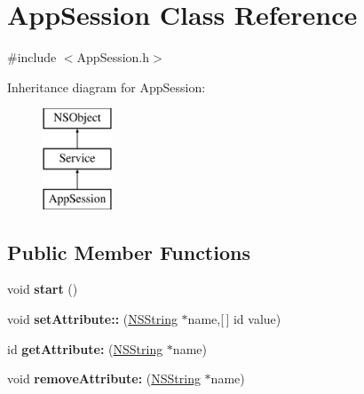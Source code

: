 \hypertarget{interface_app_session}{
\section{\-App\-Session \-Class \-Reference}
\label{interface_app_session}
}


{\ttfamily \#include $<$\-App\-Session.\-h$>$}

\-Inheritance diagram for \-App\-Session\-:\begin{figure}[H]
\begin{center}
\leavevmode
\includegraphics[height=3.000000cm]{interface_app_session}
\end{center}
\end{figure}
\subsection*{\-Public \-Member \-Functions}
\begin{DoxyCompactItemize}
\item 
\hypertarget{interface_app_session_a7cde5b1e47a0688accbe132e4cb47fa3}{
void {\bfseries start} ()}
\label{interface_app_session_a7cde5b1e47a0688accbe132e4cb47fa3}

\item 
\hypertarget{interface_app_session_a271fac98c8d374b2b16eb9aa2e377471}{
void {\bfseries set\-Attribute\-::} (\hyperlink{class_n_s_string}{\-N\-S\-String} $\ast$name,\mbox{[}$\,$\mbox{]} id value)}
\label{interface_app_session_a271fac98c8d374b2b16eb9aa2e377471}

\item 
\hypertarget{interface_app_session_af93b42969f1490778007171cc125a160}{
id {\bfseries get\-Attribute\-:} (\hyperlink{class_n_s_string}{\-N\-S\-String} $\ast$name)}
\label{interface_app_session_af93b42969f1490778007171cc125a160}

\item 
\hypertarget{interface_app_session_a361e3087a5c8d2a86c755ea695354ede}{
void {\bfseries remove\-Attribute\-:} (\hyperlink{class_n_s_string}{\-N\-S\-String} $\ast$name)}
\label{interface_app_session_a361e3087a5c8d2a86c755ea695354ede}

\end{DoxyCompactItemize}
